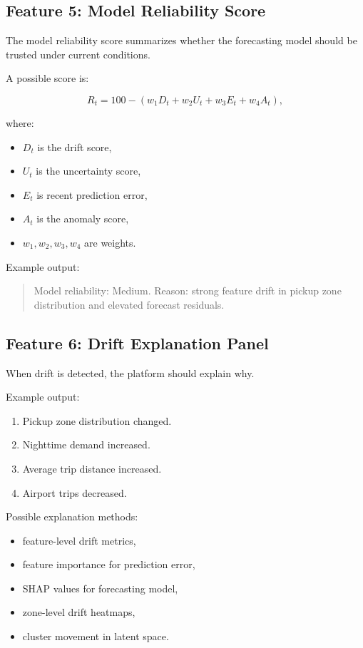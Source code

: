 \documentclass[11pt]{article}
\begin{document}
\subsection{Feature 5: Model Reliability Score}

The model reliability score summarizes whether the forecasting model should be trusted under current conditions.

A possible score is:

\[
    R_t = 100 - \left( w_1 D_t + w_2 U_t + w_3 E_t + w_4 A_t \right),
\]

where:

\begin{itemize}
    \item $D_t$ is the drift score,
    \item $U_t$ is the uncertainty score,
    \item $E_t$ is recent prediction error,
    \item $A_t$ is the anomaly score,
    \item $w_1,w_2,w_3,w_4$ are weights.
\end{itemize}

Example output:

\begin{quote}
    Model reliability: Medium. Reason: strong feature drift in pickup zone distribution and elevated forecast residuals.
\end{quote}

\subsection{Feature 6: Drift Explanation Panel}

When drift is detected, the platform should explain why.

Example output:

\begin{enumerate}
    \item Pickup zone distribution changed.
    \item Nighttime demand increased.
    \item Average trip distance increased.
    \item Airport trips decreased.
\end{enumerate}

Possible explanation methods:

\begin{itemize}
    \item feature-level drift metrics,
    \item feature importance for prediction error,
    \item SHAP values for forecasting model,
    \item zone-level drift heatmaps,
    \item cluster movement in latent space.
\end{itemize}
\end{document}

